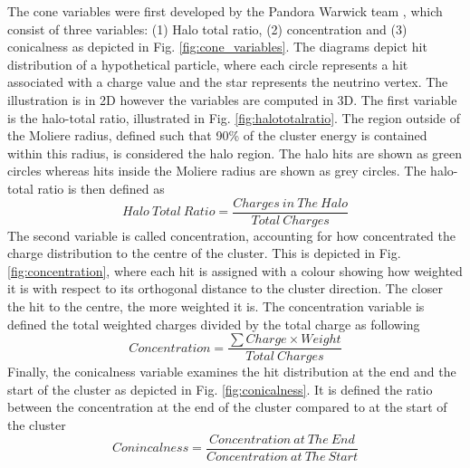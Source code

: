 The cone variables were first developed by the Pandora Warwick team \cite{}, which consist of three variables: (1) Halo total ratio, (2) concentration and (3) conicalness as depicted in Fig. \ref{fig:cone_variables}.
The diagrams depict hit distribution of a hypothetical particle, where each circle represents a hit associated with a charge value and the star represents the neutrino vertex.
The illustration is in 2D however the variables are computed in 3D.
The first variable is the halo-total ratio, illustrated in Fig. \ref{fig:halototalratio}.
The region outside of the Moliere radius, defined such that 90\% of the cluster energy is contained within this radius, is considered the halo region.
The halo hits are shown as green circles whereas hits inside the Moliere radius are shown as grey circles.
The halo-total ratio is then defined as 
\begin{equation}
	Halo\ Total\ Ratio = \frac{Charges\ in\ The\ Halo}{Total\ Charges}
\end{equation}
The second variable is called concentration, accounting for how concentrated the charge distribution to the centre of the cluster.
This is depicted in Fig. \ref{fig:concentration}, where each hit is assigned with a colour showing how weighted it is with respect to its orthogonal distance to the cluster direction.
The closer the hit to the centre, the more weighted it is.
The concentration variable is defined the total weighted charges divided by the total charge as following
\begin{equation}
	Concentration = \frac{\sum Charge \times Weight}{Total\ Charges}
\end{equation}
Finally, the conicalness variable examines the hit distribution at the end and the start of the cluster as depicted in Fig. \ref{fig:conicalness}. 
It is defined the ratio between the concentration at the end of the cluster compared to at the start of the cluster
\begin{equation}
	Conincalness = \frac{Concentration\ at\ The\ End}{Concentration\ at\ The\ Start}
\end{equation}
